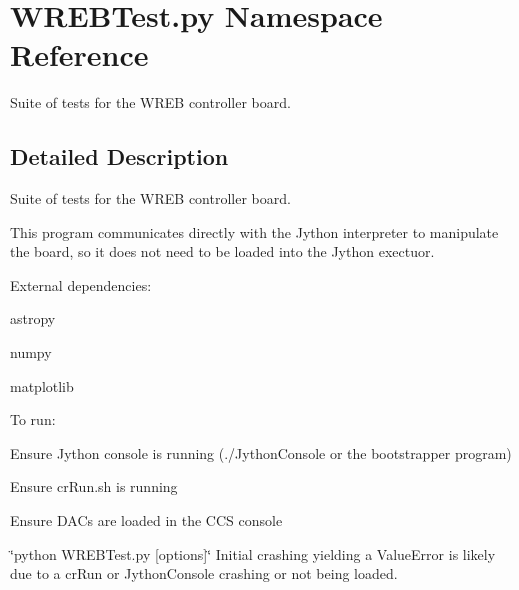 \hypertarget{namespace_w_r_e_b_test_1_1py}{}\section{W\+R\+E\+B\+Test.\+py Namespace Reference}
\label{namespace_w_r_e_b_test_1_1py}


Suite of tests for the W\+R\+EB controller board.  




\subsection{Detailed Description}
Suite of tests for the W\+R\+EB controller board. 

This program communicates directly with the Jython interpreter to manipulate the board, so it does not need to be loaded into the Jython exectuor.

External dependencies\+:
\begin{DoxyItemize}
\item astropy
\item numpy
\item matplotlib
\end{DoxyItemize}

To run\+:
\begin{DoxyItemize}
\item Ensure Jython console is running (./\+Jython\+Console or the bootstrapper program)
\item Ensure cr\+Run.\+sh is running
\item Ensure D\+A\+Cs are loaded in the C\+CS console
\item \char`\"{}python W\+R\+E\+B\+Test.\+py \mbox{[}options\mbox{]}\char`\"{} Initial crashing yielding a Value\+Error is likely due to a cr\+Run or Jython\+Console crashing or not being loaded. 
\end{DoxyItemize}